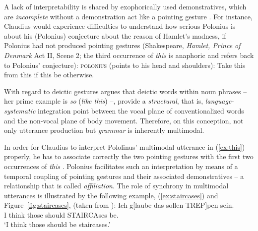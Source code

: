 \documentclass[output=paper]{langsci/langscibook}
\begin{document}
%
%
A lack of interpretability is shared by exophorically used demonstratives, which are \emph{incomplete}  without a demonstration act like a pointing gesture \citep[]{Kaplan:1989:a}.
%
For instance, Claudius would experience difficulties to understand how serious Polonius is about his (Polonius) conjecture about the reason of Hamlet's madness, if Polonius had not produced pointing gestures (Shakespeare,  \textit{Hamlet, Prince of Denmark} Act II, Scene 2; the third occurrence of \textit{this} is anaphoric and refers back to Polonius' conjecture):
%
\ea \label{ex:this}
\textsc{polonius} (points to his head and shoulders): 
Take this from this if this be otherwise.
\z

With regard to deictic gestures \citet[Sec.~5.4]{Fricke:2012} argues that deictic words   within noun phrases -- her prime example is  \textit{so} (\textit{like this}) --, provide a \emph{structural}, that is, \emph{language-systematic} integration point between the vocal plane of conventionalized words and the non-vocal plane of body movement. 
%
Therefore, on this conception, not only utterance production but \emph{grammar} is inherently multimodal. 


In order for Claudius to interpret Pololinus' multimodal utterance in (\ref{ex:this}) properly, he has to associate correctly the two pointing gestures with the first two occurrences of \textit{this} \citep[cf.][]{Kupffer:2014}. 
%
Polonius facilitates such an interpretation by means of a temporal coupling of pointing gestures and their associated demonstratives -- a relationship that is called \emph{affiliation}.
%
The role of synchrony in multimodal utterances is illustrated by the following example, (\ref{ex:staircases}) and Figure~\ref{fig:staircases}, (taken from \citet[]{Luecking:2013:a}):
%
\ea \label{ex:staircases}
\gll Ich g[laube das sollen TREP]pen sein.\\
     I think those should STAIRCAses be. \\
\glt \enquote*{I think those should be staircases.}
\z
\end{document}
